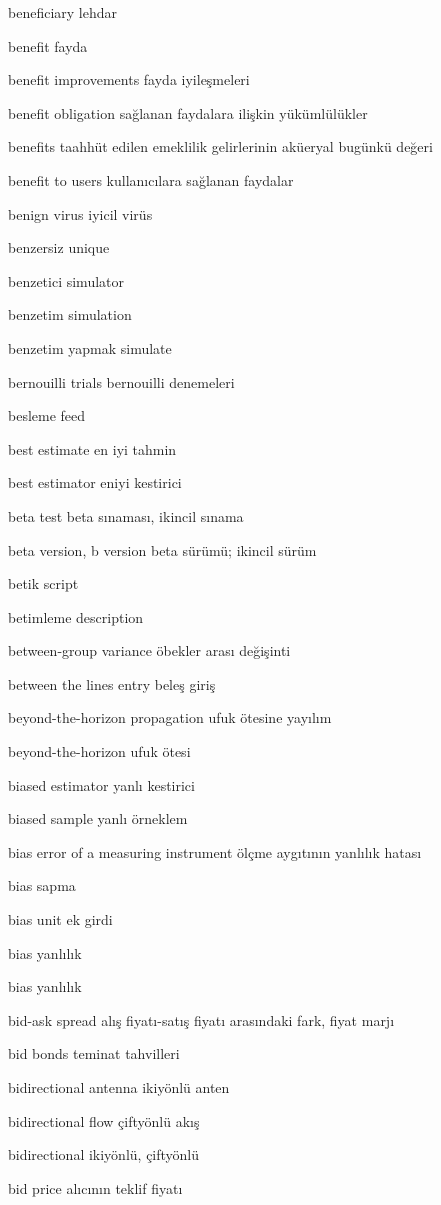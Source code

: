 \documentclass[12pt,fleqn]{article}\usepackage{../../common}
\begin{document}
beneficiary lehdar

benefit fayda

benefit improvements fayda iyileşmeleri

benefit obligation sağlanan faydalara ilişkin yükümlülükler

benefits taahhüt edilen emeklilik gelirlerinin aküeryal bugünkü değeri

benefit to users kullanıcılara sağlanan faydalar

benign virus iyicil virüs

benzersiz unique

benzetici simulator

benzetim simulation

benzetim yapmak simulate

bernouilli trials bernouilli denemeleri

besleme feed

best estimate en iyi tahmin

best estimator eniyi kestirici

beta test beta sınaması, ikincil sınama

beta version, b version beta sürümü; ikincil sürüm

betik script

betimleme description

between-group variance öbekler arası değişinti

between the lines entry beleş giriş

beyond-the-horizon propagation ufuk ötesine yayılım

beyond-the-horizon ufuk ötesi

biased estimator yanlı kestirici

biased sample yanlı örneklem

bias error of a measuring instrument ölçme aygıtının yanlılık hatası

bias sapma

bias unit ek girdi

bias yanlılık

bias yanlılık

bid-ask spread alış fiyatı-satış fiyatı arasındaki fark, fiyat marjı

bid bonds teminat tahvilleri

bidirectional antenna ikiyönlü anten

bidirectional flow çiftyönlü akış

bidirectional ikiyönlü, çiftyönlü

bid price alıcının teklif fiyatı
\end{document}

